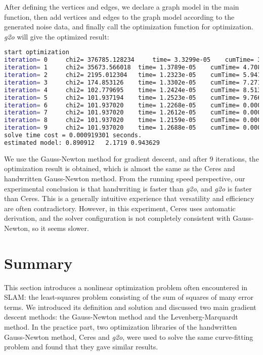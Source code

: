 After defining the vertices and edges, we declare a graph model in the main function, then add vertices and edges to the graph model according to the generated noise data, and finally call the optimization function for optimization. \textit{g2o} will give the optimized result:
\begin{lstlisting}[language=sh,caption=Terminal output:]
start optimization
iteration= 0	 chi2= 376785.128234	 time= 3.3299e-05	 cumTime= 3.3299e-05	 edges= 100	 schur= 0
iteration= 1	 chi2= 35673.566018	 time= 1.3789e-05	 cumTime= 4.7088e-05	 edges= 100	 schur= 0
iteration= 2	 chi2= 2195.012304	 time= 1.2323e-05	 cumTime= 5.9411e-05	 edges= 100	 schur= 0
iteration= 3	 chi2= 174.853126	 time= 1.3302e-05	 cumTime= 7.2713e-05	 edges= 100	 schur= 0
iteration= 4	 chi2= 102.779695	 time= 1.2424e-05	 cumTime= 8.5137e-05	 edges= 100	 schur= 0
iteration= 5	 chi2= 101.937194	 time= 1.2523e-05	 cumTime= 9.766e-05	 edges= 100	 schur= 0
iteration= 6	 chi2= 101.937020	 time= 1.2268e-05	 cumTime= 0.000109928	 edges= 100	 schur= 0
iteration= 7	 chi2= 101.937020	 time= 1.2612e-05	 cumTime= 0.00012254	 edges= 100	 schur= 0
iteration= 8	 chi2= 101.937020	 time= 1.2159e-05	 cumTime= 0.000134699	 edges= 100	 schur= 0
iteration= 9	 chi2= 101.937020	 time= 1.2688e-05	 cumTime= 0.000147387	 edges= 100	 schur= 0
solve time cost = 0.000919301 seconds. 
estimated model: 0.890912   2.1719 0.943629
\end{lstlisting}

We use the Gauss-Newton method for gradient descent, and after 9 iterations, the optimization result is obtained, which is almost the same as the Ceres and handwritten Gauss-Newton method. From the running speed perspective, our experimental conclusion is that handwriting is faster than \textit{g2o}, and \textit{g2o} is faster than Ceres. This is a generally intuitive experience that versatility and efficiency are often contradictory. However, in this experiment, Ceres uses automatic derivation, and the solver configuration is not completely consistent with Gauss-Newton, so it seems slower.

\section{Summary}
This section introduces a nonlinear optimization problem often encountered in SLAM: the least-squares problem consisting of the sum of squares of many error terms. We introduced its definition and solution and discussed two main gradient descent methods: the Gauss-Newton method and the Levenberg-Marquardt method. In the practice part, two optimization libraries of the handwritten Gauss-Newton method, Ceres and \textit{g2o}, were used to solve the same curve-fitting problem and found that they gave similar results.

